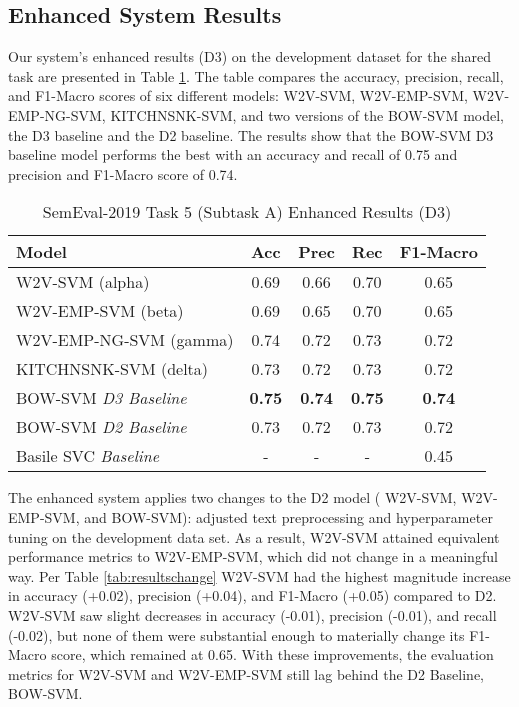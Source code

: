 \documentclass[11pt,a4paper]{article}
\begin{document}
\subsection{Enhanced System Results}
Our system's enhanced results (D3) on the development dataset for the shared task are presented in Table \ref{tab:enhancedresults}. The table compares the accuracy, precision, recall, and F1-Macro scores of six different models: \textsc{W2V-SVM}, \textsc{W2V-EMP-SVM}, \textsc{W2V-EMP-NG-SVM}, \textsc{KITCHNSNK-SVM}, and two versions of the \textsc{BOW-SVM} model, the D3 baseline and the D2 baseline. The results show that the \textsc{BOW-SVM} D3 baseline model performs the best with an accuracy and recall of 0.75 and precision and F1-Macro score of 0.74. 


\begin{table}[h]
\centering
\caption{SemEval-2019 Task 5 (Subtask A) Enhanced Results (D3)}
\label{tab:enhancedresults}
\scriptsize
\begin{tabular}{lcccc}
\hline
Model & Acc & Prec & Rec & F1-Macro \\ \hline
\textsc{W2V-SVM} (alpha) & 0.69 & 0.66 & 0.70 & 0.65  \\
\textsc{W2V-EMP-SVM} (beta) & 0.69 & 0.65 & 0.70 & 0.65 \\
\textsc{W2V-EMP-NG-SVM} (gamma) & 0.74 & 0.72 & 0.73 & 0.72 \\
\textsc{KITCHNSNK-SVM} (delta) & 0.73 & 0.72 & 0.73 & 0.72 \\
\textsc{BOW-SVM} \textit{D3 Baseline} & \textbf{0.75} & \textbf{0.74} & \textbf{0.75} & \textbf{0.74} \\
\textsc{BOW-SVM} \textit{D2 Baseline} & 0.73 & 0.72 & 0.73 & 0.72 \\
Basile SVC \textit{Baseline} & - & - & - & 0.45 \\ \hline
\end{tabular}
\end{table}

The enhanced system applies two changes to the D2 model ( \textsc{W2V-SVM}, \textsc{W2V-EMP-SVM}, and \textsc{BOW-SVM}): adjusted text preprocessing and hyperparameter tuning on the development data set. As a result, \textsc{W2V-SVM} attained equivalent performance metrics to \textsc{W2V-EMP-SVM}, which did not change in a meaningful way. Per Table \ref{tab:resultschange} \textsc{W2V-SVM} had the highest magnitude increase in accuracy (+0.02), precision (+0.04), and F1-Macro (+0.05) compared to D2. \textsc{W2V-SVM} saw slight decreases in accuracy (-0.01), precision (-0.01), and recall (-0.02), but none of them were substantial enough to materially change its F1-Macro score, which remained at 0.65. With these improvements, the evaluation metrics for \textsc{W2V-SVM} and \textsc{W2V-EMP-SVM} still lag behind the D2 Baseline, \textsc{BOW-SVM}.
\end{document}
